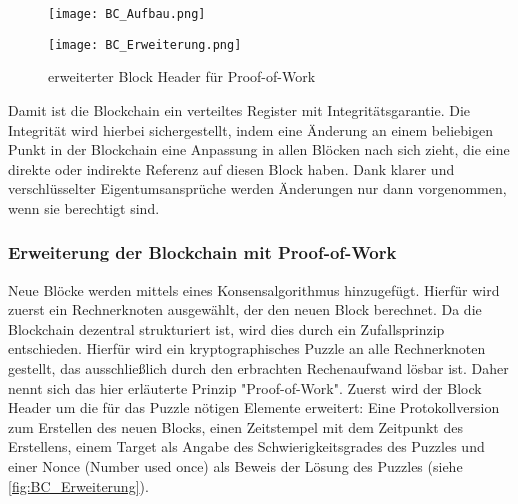 \begin{figure}[!h]
    \begin{minipage}{.66\textwidth}
        \texttt{[image: BC\_Aufbau.png]}
        \label{fig:BC_Aufbau}
    \end{minipage}
    \begin{minipage}{.33\textwidth}
        \texttt{[image: BC\_Erweiterung.png]}
        \caption{erweiterter Block Header für Proof-of-Work}
        \label{fig:BC_Erweiterung}
    \end{minipage}
\end{figure}


Damit ist die Blockchain ein verteiltes Register mit Integritätsgarantie. Die Integrität 
wird hierbei sichergestellt, indem eine Änderung an einem beliebigen Punkt in der
Blockchain eine Anpassung in allen Blöcken nach sich zieht, die eine direkte oder
indirekte Referenz auf diesen Block haben. Dank klarer und verschlüsselter Eigentumsansprüche
werden Änderungen nur dann vorgenommen, wenn sie berechtigt sind.
\cite[p.~22]{fill2020blockchain} 

\subsubsection{Erweiterung der Blockchain mit Proof-of-Work}
\label{sec:Erweiterung}
Neue Blöcke werden mittels eines Konsensalgorithmus hinzugefügt.
Hierfür wird zuerst ein Rechnerknoten ausgewählt, der den neuen Block berechnet. 
Da die Blockchain dezentral strukturiert ist, wird dies durch ein Zufallsprinzip entschieden.
Hierfür wird ein kryptographisches Puzzle an alle Rechnerknoten gestellt, das ausschließlich
durch den erbrachten Rechenaufwand lösbar ist. Daher nennt sich das hier erläuterte Prinzip
"Proof-of-Work". Zuerst wird der Block Header um die für das Puzzle nötigen Elemente 
erweitert: Eine Protokollversion zum Erstellen des neuen Blocks, einen Zeitstempel mit
dem Zeitpunkt des Erstellens, einem Target als Angabe des Schwierigkeitsgrades des Puzzles
und einer Nonce (Number used once) als Beweis der Lösung des Puzzles (siehe \autoref{fig:BC_Erweiterung}).

